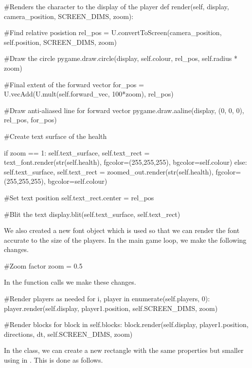 \begin{mpy}
    #Renders the character to the display of the player
    def render(self, display, camera_position, SCREEN_DIMS, zoom):

        #Find relative posistion
        rel_pos = U.convertToScreen(camera_position, self.position, SCREEN_DIMS, zoom)

        #Draw the circle
        pygame.draw.circle(display, self.colour, rel_pos, self.radius * zoom)

        #Final extent of the forward vector
        for_pos = U.vecAdd(U.mult(self.forward_vec, 100*zoom), rel_pos)

        #Draw anti-aliased line for forward vector
        pygame.draw.aaline(display, (0, 0, 0), rel_pos, for_pos)

        #Create text surface of the health

        if zoom == 1:
            self.text_surface, self.text_rect = text_font.render(str(self.health), fgcolor=(255,255,255), bgcolor=self.colour)
        else:
            self.text_surface, self.text_rect = zoomed_out.render(str(self.health), fgcolor=(255,255,255), bgcolor=self.colour)

        #Set text position
        self.text_rect.center = rel_pos

        #Blit the text
        display.blit(self.text_surface, self.text_rect)
\end{mpy}

We also created a new font object which is used so that we can render the font accurate to the size of the players. In the main game loop, we make the following changes.

\begin{mpy}
        #Zoom factor
        zoom = 0.5
\end{mpy}

In the  function calls we make these changes.

\begin{mpy}
            #Render players as needed
            for i, player in enumerate(self.players, 0):
                player.render(self.display, player1.position, self.SCREEN_DIMS, zoom)

            #Render blocks
            for block in self.blocks:
                block.render(self.display, player1.position, directions, dt, self.SCREEN_DIMS, zoom)
\end{mpy}


In the  class, we can create a new rectangle with the same properties but smaller using  in . This is done as follows.

